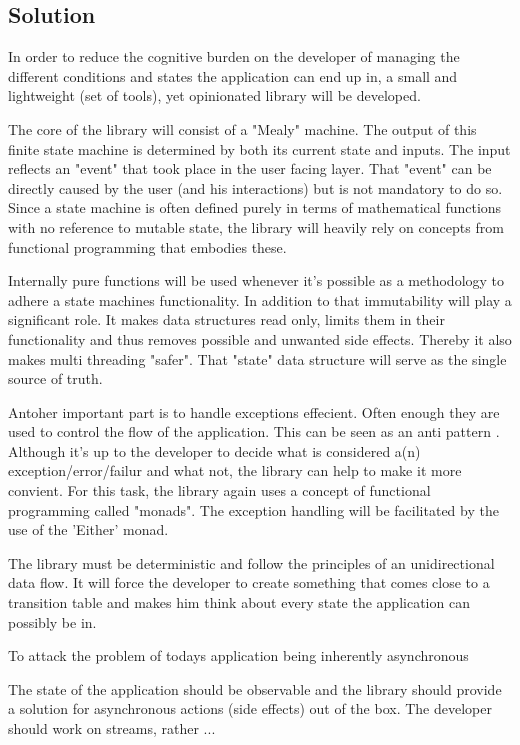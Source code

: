 \subsection{Solution}
\label{subsec:solution}

In order to reduce the cognitive burden on the developer of managing the different conditions and 
states the application can end up in, a small and lightweight (set of tools), yet opinionated library will be developed.

The core of the library will consist of a "Mealy" machine. 
The output of this finite state machine is determined by both its current state and inputs.
The input reflects an "event" that took place in the user facing layer.
That "event" can be directly caused by the user (and his interactions) but is not mandatory to do so.
Since a state machine is often defined purely in terms of mathematical functions with no reference to mutable state, 
the library will heavily rely on concepts from functional programming that embodies these.

Internally pure functions will be used whenever it's possible as a methodology to adhere a state machines functionality.
In addition to that immutability will play a significant role. It makes data structures read only, limits them in their functionality 
and thus removes possible and unwanted side effects. Thereby it also makes multi threading "safer".
That "state" data structure will serve as the single source of truth.


Antoher important part is to handle exceptions effecient. Often enough they are used to control the flow of
the application. This can be seen as an anti pattern \cite{dontUseExceptionsForFlowControl}.
Although it's up to the developer to decide what is considered a(n) exception/error/failur and what not, 
the library can help to make it more convient.
For this task, the library again uses a concept of functional programming called "monads".
The exception handling will be facilitated by the use of the 'Either' monad.

The library must be deterministic and follow the principles of an unidirectional data flow. 
It will force the developer to create something that comes close to a transition table and makes him 
think about every state the application can possibly be in.



To attack the problem of todays application being inherently asynchronous 


The state of the application should be observable and the library should provide
a solution for asynchronous actions (side effects) out of the box. The developer
should work on streams, rather ...

